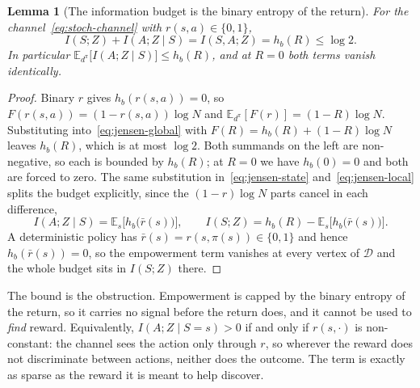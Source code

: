 \documentclass[11pt]{article}
\newtheorem{lemma}{Lemma}
\theoremstyle{remark}
\newcommand{\Dcal}{\mathcal D}
\newcommand{\E}{\mathbb E}
\newcommand{\1}{\mathds{1}}
\newcommand{\occ}{d^{\pi}}
\begin{document}
\begin{lemma}[The information budget is the binary entropy of the return]
\label{lem:budget}
For the channel~\eqref{eq:stoch-channel} with $r(s,a)\in\{0,1\}$,
\begin{equation}
  I(S;Z)+I(A;Z\mid S)=I(S,A;Z)=h_b(R)\le\log 2 .
  \label{eq:budget-bound}
\end{equation}
In particular $\E_{\occ}\big[I(A;Z\mid S)\big]\le h_b(R)$, and at $R=0$ both terms vanish identically.
\end{lemma}

\begin{proof}
Binary $r$ gives $h_b(r(s,a))=0$, so $F(r(s,a))=(1-r(s,a))\log N$ and $\E_{\occ}[F(r)]=(1-R)\log N$.
Substituting into~\eqref{eq:jensen-global} with $F(R)=h_b(R)+(1-R)\log N$ leaves $h_b(R)$, which is at most $\log 2$.
Both summands on the left are non-negative, so each is bounded by $h_b(R)$; at $R=0$ we have $h_b(0)=0$ and both are forced to zero.
The same substitution in~\eqref{eq:jensen-state} and~\eqref{eq:jensen-local} splits the budget explicitly, since the $(1-r)\log N$ parts cancel in each difference,
\begin{equation}
  I(A;Z\mid S)=\E_{s}\big[h_b\big(\bar r(s)\big)\big],
  \qquad
  I(S;Z)=h_b(R)-\E_{s}\big[h_b\big(\bar r(s)\big)\big] .
  \label{eq:budget-binary}
\end{equation}
A deterministic policy has $\bar r(s)=r(s,\pi(s))\in\{0,1\}$ and hence $h_b(\bar r(s))=0$, so the empowerment term vanishes at every vertex of $\Dcal$ and the whole budget sits in $I(S;Z)$ there.
\end{proof}

The bound is the obstruction.
Empowerment is capped by the binary entropy of the return, so it carries no signal before the return does, and it cannot be used to \emph{find} reward.
Equivalently, $I(A;Z\mid S=s)>0$ if and only if $r(s,\cdot)$ is non-constant: the channel sees the action only through $r$, so wherever the reward does not discriminate between actions, neither does the outcome.
The term is exactly as sparse as the reward it is meant to help discover.
\end{document}

